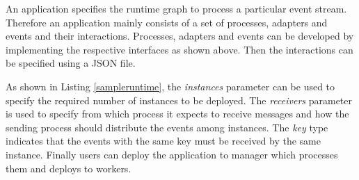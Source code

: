 An application specifies the runtime graph to process a particular event stream. Therefore an application mainly consists of a set of processes, adapters and events and their interactions. Processes, adapters and events can be developed by implementing the respective interfaces as shown above. Then the interactions can be specified using a JSON file. 



As shown in Listing \ref{sampleruntime}, the \textit{instances} parameter can be used to specify the required number of instances to be deployed. The \textit{receivers} parameter is used to specify from which process it expects to receive messages and how the sending process should distribute the events among instances. The \textit{key} type indicates that the events with the same key must be received by the same instance. Finally users can deploy the application to manager which processes them and deploys to workers.






 
